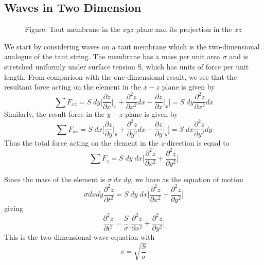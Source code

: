 \documentclass[../../../main.tex]{subfiles}
\begin{document}
\subsection{Waves in Two Dimension}
\begin{figure*}
    \centering
    \caption*{Figure: Taut membrane in the $xyz$ plane and its projection in the $xz$}
\end{figure*}
We start by considering waves on a taut membrane which is the two-dimensional analogue of the taut string. The membrane has a mass per unit area $\sigma$ and is stretched uniformly under surface tension S, which has units of force per unit length. From comparison with the one-dimensional result, we see that the resultant force acting on the element in the $x-z$ plane is given by
\begin{equation*}
    \sum F_{xz}=S\;dy\biggl[\frac{\partial z}{\partial x}\bigg|_x+\frac{\partial^2 z}{\partial x^2}dx-\frac{\partial z}{\partial x}\bigg|_x\biggr]=S\;dy\frac{\partial^2 z}{\partial x^2}dx
\end{equation*}
Similarly, the result force in the $y-z$ plane is given by
\begin{equation*}
    \sum F_{xz}=S\;dx\biggl[\frac{\partial z}{\partial y}\bigg|_y+\frac{\partial^2 z}{\partial y^2}dx-\frac{\partial z}{\partial y}\bigg|_y\biggr]=S\;dx\frac{\partial^2 z}{\partial y^2}dy    
\end{equation*}
Thus the total force acting on the element in the $z$-direction is equal to
\begin{equation*}
    \sum F_z=S\;dy\;dx\biggl[\frac{\partial^2 z}{\partial x^2}+\frac{\partial^2 z}{\partial y^2}\biggr]
\end{equation*}

Since the mass of the element is $\sigma\;dx\;dy$, we have as the equation of motion
\begin{equation*}
    \sigma dx dy \frac{\partial^2 z}{\partial t^2}=S\;dy\;dx\biggl[\frac{\partial^2 z}{\partial x^2}+\frac{\partial^2 z}{\partial y^2}\biggr]
\end{equation*}
giving
\begin{equation*}
    \frac{\partial^2 z}{\partial t^2}=\frac{S}{\sigma}\biggl[\frac{\partial^2 z}{\partial x^2}+\frac{\partial^2 z}{\partial y^2}\biggr]
\end{equation*}
This is the two-dimensional wave equation with
\begin{equation*}
    v=\sqrt{\frac{S}{\sigma}}
\end{equation*}
\end{document}

